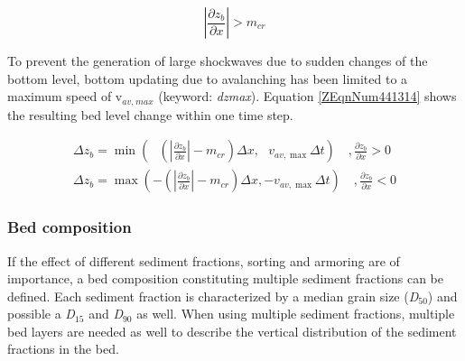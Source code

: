 \documentclass{article}
\begin{document}
\noindent 
\begin{equation} \label{2.110)} 
\left|\frac{\partial z_{b} }{\partial x} \right|>m_{cr}  
\end{equation} 


\noindent To prevent the generation of large shockwaves due to sudden changes of the bottom level, bottom updating due to avalanching has been limited to a maximum speed of v\textit{${}_{av,}$}${}_{max}$ (keyword: \textit{dzmax}). Equation \eqref{ZEqnNum441314} shows the resulting bed level change within one time step. 

\noindent 
\begin{equation} \label{ZEqnNum441314} 
\begin{array}{l} {\Delta z_{b} =\min \left(\, \, \, \, \left(\left|\frac{\partial z_{b} }{\partial x} \right|-m_{cr} \right)\Delta x,\, \, \, \, v_{av,\max } \Delta t\right)\quad ,\frac{\partial z_{b} }{\partial x} >0} \\ {\Delta z_{b} =\max \left(-\left(\left|\frac{\partial z_{b} }{\partial x} \right|-m_{cr} \right)\Delta x,-v_{av,\max } \Delta t\right)\quad ,\frac{\partial z_{b} }{\partial x} <0} \end{array} 
\end{equation} 


\subsubsection{ Bed composition}

\noindent If the effect of different sediment fractions, sorting and armoring are of importance, a bed composition constituting multiple sediment fractions can be defined. Each sediment fraction is characterized by a median grain size (\textit{D${}_{50}$}) and possible a \textit{D${}_{15}$} and \textit{D${}_{90}$} as well. When using multiple sediment fractions, multiple bed layers are needed as well to describe the vertical distribution of the sediment fractions in the bed.
\end{document}
